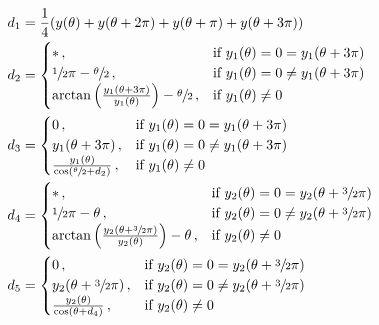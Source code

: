 \begin{subequations}
    \label{eq:constants}
    \begin{align}
        d_1 &= \frac14 (y(\theta) + y(\theta + 2\pi) + y(\theta + \pi) + y(\theta + 3\pi))
            \label{eq:constants-d1}\\
        d_2 &=
            \begin{cases}
                *
                    \,, & \textrm{if } y_1(\theta) = 0 = y_1(\theta + 3\pi)\\
                \sfrac12\pi - \sfrac\theta2
                    \,, & \textrm{if } y_1(\theta) = 0 \neq y_1(\theta + 3\pi)\\
                \arctan\left(\frac{y_1(\theta + 3\pi)}{y_1(\theta)}\right) - \sfrac\theta2
                    \,, & \textrm{if }y_1(\theta) \neq 0
            \end{cases}
            \label{eq:constants-d2}\\
        d_3 &=
            \begin{cases}
                0
                    \,, & \textrm{if } y_1(\theta) = 0 = y_1(\theta + 3\pi)\\
                y_1(\theta + 3\pi)
                    \,, & \textrm{if } y_1(\theta) = 0 \neq y_1(\theta + 3\pi)\\
                \frac{y_1(\theta)}{\cos(\sfrac\theta2 + d_2)}
                    \,, & \textrm{if } y_1(\theta) \neq 0
            \end{cases}
            \label{eq:constants-d3}\\
        d_4 &=
            \begin{cases}
                *
                    \,, & \textrm{if } y_2(\theta) = 0 = y_2(\theta + \sfrac32\pi)\\
                \sfrac12\pi - \theta
                    \,, & \textrm{if } y_2(\theta) = 0 \neq y_2(\theta + \sfrac32\pi)\\
                \arctan\left(\frac{y_2(\theta + \sfrac32 \pi)}{y_2(\theta)}\right) - \theta
                    \,, & \textrm{if } y_2(\theta) \neq 0
            \end{cases}
            \label{eq:constants-d4}\\
        d_5 &=
            \begin{cases}
                0
                    \,, & \textrm{if } y_2(\theta) = 0 = y_2(\theta + \sfrac32\pi)\\
                y_2(\theta + \sfrac32\pi)
                    \,, & \textrm{if } y_2(\theta) = 0 \neq y_2(\theta + \sfrac32\pi)\\
                \frac{y_2(\theta)}{\cos(\theta + d_4)}
                    \,, & \textrm{if } y_2(\theta) \neq 0
            \end{cases}
            \label{eq:constants-d5}
    \end{align}
\end{subequations}

